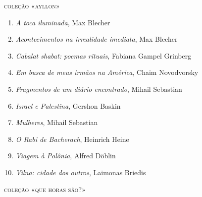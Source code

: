 \medskip
{\large\textsc{coleção «ayllon»}}



\begin{enumerate}
\setlength{\topsep}{2pt}
\setlength{\partopsep}{0pt}
\setlength\parskip{4.2pt}
\setlength\itemsep{-1.4mm}
\item \textit{A toca iluminada}, Max Blecher
\item \textit{Acontecimentos na irrealidade imediata}, Max Blecher
\item \textit{Cabalat shabat: poemas rituais}, Fabiana Gampel Grinberg
\item \textit{Em busca de meus irmãos na América}, Chaim Novodvorsky
\item \textit{Fragmentos de um diário encontrado}, Mihail Sebastian
\item \textit{Israel e Palestina}, Gershon Baskin
\item \textit{Mulheres}, Mihail Sebastian
\item \textit{O Rabi de Bacherach}, Heinrich Heine
\item \textit{Viagem à Polônia}, Alfred Döblin
\item \textit{Vilna: cidade dos outros}, Laimonas Briedis
\end{enumerate}


\medskip
{\large\textsc{coleção «que horas são?»}}%

